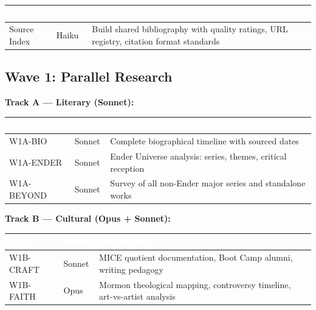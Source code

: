 \documentclass[11pt,letterpaper]{article}
\newcommand{\tableheader}[1]{\textbf{\sffamily\textcolor{white}{#1}}}
\begin{document}
\begin{center}
\begin{tabularx}{\textwidth}{L{3cm}C{1.5cm}X}
\toprule
{}
\tableheader{Task} & \tableheader{Model} & \tableheader{Description} \\
\midrule
Source Index & Haiku & Build shared bibliography with quality ratings, URL registry, citation format standards \\
\bottomrule
\end{tabularx}
\end{center}

\subsection{Wave 1: Parallel Research}

\textbf{Track A --- Literary (Sonnet):}

\begin{center}
\begin{tabularx}{\textwidth}{L{3cm}C{1.5cm}X}
\toprule
{}
\tableheader{Task} & \tableheader{Model} & \tableheader{Description} \\
\midrule
W1A-BIO & Sonnet & Complete biographical timeline with sourced dates \\
W1A-ENDER & Sonnet & Ender Universe analysis: series, themes, critical reception \\
W1A-BEYOND & Sonnet & Survey of all non-Ender major series and standalone works \\
\bottomrule
\end{tabularx}
\end{center}

\textbf{Track B --- Cultural (Opus + Sonnet):}

\begin{center}
\begin{tabularx}{\textwidth}{L{3cm}C{1.5cm}X}
\toprule
{}
\tableheader{Task} & \tableheader{Model} & \tableheader{Description} \\
\midrule
W1B-CRAFT & Sonnet & MICE quotient documentation, Boot Camp alumni, writing pedagogy \\
W1B-FAITH & Opus & Mormon theological mapping, controversy timeline, art-vs-artist analysis \\
\bottomrule
\end{tabularx}
\end{center}
\end{document}
